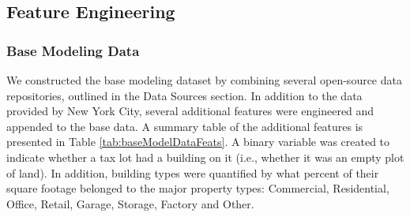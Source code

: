 \documentclass[conference,final,]{IEEEtran}
\begin{document}
\hypertarget{feature-engineering}{%
\subsection{Feature Engineering}\label{feature-engineering}}

\hypertarget{base-modeling-data}{%
\subsubsection{Base Modeling Data}\label{base-modeling-data}}

We constructed the base modeling dataset by combining several
open-source data repositories, outlined in the Data Sources section. In
addition to the data provided by New York City, several additional
features were engineered and appended to the base data. A summary table
of the additional features is presented in Table
\ref{tab:baseModelDataFeats}. A binary variable was created to indicate
whether a tax lot had a building on it (i.e., whether it was an empty
plot of land). In addition, building types were quantified by what
percent of their square footage belonged to the major property types:
Commercial, Residential, Office, Retail, Garage, Storage, Factory and
Other.
\end{document}
